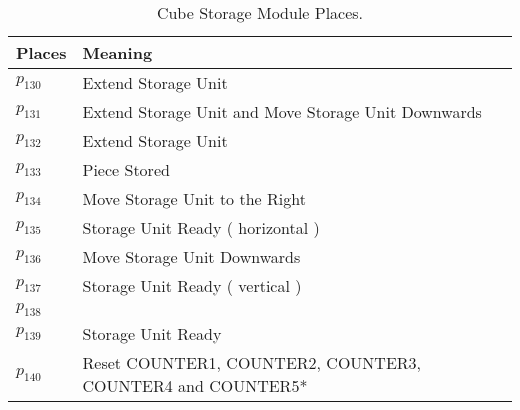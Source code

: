 \begin{table}[H]
\caption{Cube Storage Module Places.}
\centering
\begin{tabular}{M{5cm}M{10cm}}
Places & Meaning\\
\hline
\hyperlink{partialNet:p130}{\hypertarget{partialTable:p130}{$p_{130}$}} & Extend Storage Unit\\
\hyperlink{partialNet:p131}{\hypertarget{partialTable:p131}{$p_{131}$}} & Extend Storage Unit and Move Storage Unit Downwards\\
\hyperlink{partialNet:p132}{\hypertarget{partialTable:p132}{$p_{132}$}} & Extend Storage Unit\\
\hyperlink{partialNet:p133}{\hypertarget{partialTable:p133}{$p_{133}$}} & Piece Stored\\
\hyperlink{partialNet:p134}{\hypertarget{partialTable:p134}{$p_{134}$}} & Move Storage Unit to the Right\\
\hyperlink{partialNet:p135}{\hypertarget{partialTable:p135}{$p_{135}$}} & Storage Unit Ready ( horizontal )\\
\hyperlink{partialNet:p136}{\hypertarget{partialTable:p136}{$p_{136}$}} & Move Storage Unit Downwards\\
\hyperlink{partialNet:p137}{\hypertarget{partialTable:p137}{$p_{137}$}} & Storage Unit Ready ( vertical )\\
\hyperlink{partialNet:p138}{\hypertarget{partialTable:p138}{$p_{138}$}} & \\
\hyperlink{partialNet:p139}{\hypertarget{partialTable:p139}{$p_{139}$}} & Storage Unit Ready\\
\hyperlink{partialNet:p140}{\hypertarget{partialTable:p140}{$p_{140}$}} & Reset COUNTER1, COUNTER2, COUNTER3, COUNTER4 and COUNTER5*\\
\end{tabular}
\end{table}
